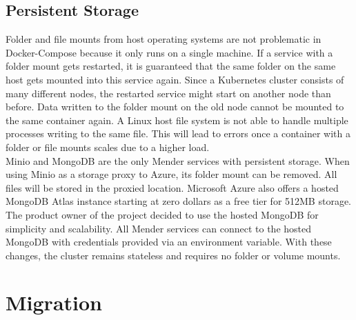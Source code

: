 \subsection{Persistent Storage}
Folder and file mounts from host operating systems are not problematic in Docker-Compose because it only runs on a single machine. If a service with a folder mount gets restarted, it is guaranteed that the same folder on the same host gets mounted into this service again. Since a Kubernetes cluster consists of many different nodes, the restarted service might start on another node than before. Data written to the folder mount on the old node cannot be mounted to the same container again. A Linux host file system is not able to handle multiple processes writing to the same file. This will lead to errors once a container with a folder or file mounts scales due to a higher load.\\
Minio and MongoDB are the only Mender services with persistent storage. When using Minio as a storage proxy to Azure, its folder mount can be removed. All files will be stored in the proxied location. Microsoft Azure also offers a hosted MongoDB Atlas instance starting at zero dollars as a free tier for 512MB storage.\cite{azuremongodbatlas} The product owner of the project decided to use the hosted MongoDB for simplicity and scalability. All Mender services can connect to the hosted MongoDB with credentials provided via an environment variable. With these changes, the cluster remains stateless and requires no folder or volume mounts.

\section{Migration}
